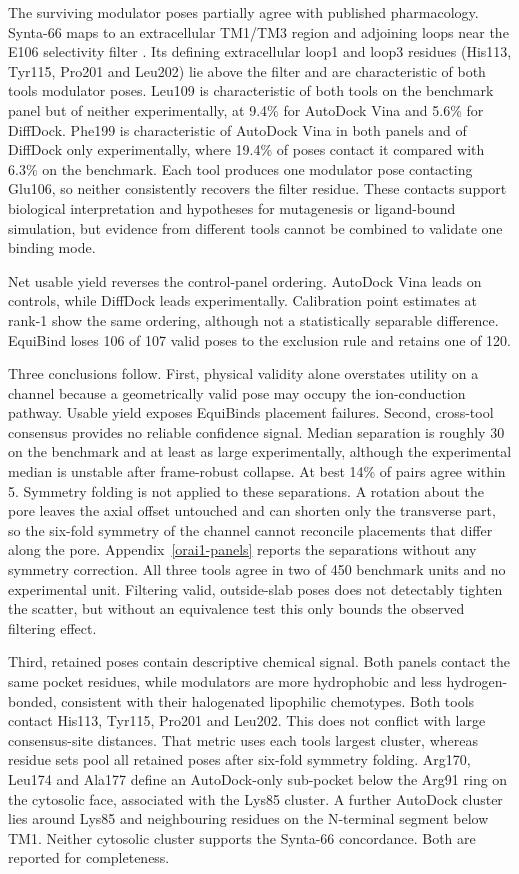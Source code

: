 The surviving modulator poses partially agree with published pharmacology. Synta-66 maps to an extracellular TM1/TM3 region and adjoining loops near the E106 selectivity filter \cite{ref071}. Its defining extracellular loop1 and loop3 residues (His113, Tyr115, Pro201 and Leu202) lie above the filter and are characteristic of both tools\textquotesingle{} modulator poses. Leu109 is characteristic of both tools on the benchmark panel but of neither experimentally, at 9.4\% for AutoDock Vina and 5.6\% for DiffDock. Phe199 is characteristic of AutoDock Vina in both panels and of DiffDock only experimentally, where 19.4\% of poses contact it compared with 6.3\% on the benchmark. Each tool produces one modulator pose contacting Glu106, so neither consistently recovers the filter residue. These contacts support biological interpretation and hypotheses for mutagenesis or ligand-bound simulation, but evidence from different tools cannot be combined to validate one binding mode.

Net usable yield reverses the control-panel ordering. AutoDock Vina leads on controls, while DiffDock leads experimentally. Calibration point estimates at rank-1 show the same ordering, although not a statistically separable difference. EquiBind loses 106 of 107 valid poses to the exclusion rule and retains one of 120.

Three conclusions follow. First, physical validity alone overstates utility on a channel because a geometrically valid pose may occupy the ion-conduction pathway. Usable yield exposes EquiBind\textquotesingle s placement failures. Second, cross-tool consensus provides no reliable confidence signal. Median separation is roughly 30\angstrom{} on the benchmark and at least as large experimentally, although the experimental median is unstable after frame-robust collapse. At best 14\% of pairs agree within 5\angstrom{}. Symmetry folding is not applied to these separations. A rotation about the pore leaves the axial offset untouched and can shorten only the transverse part, so the six-fold symmetry of the channel cannot reconcile placements that differ along the pore. Appendix~\ref{orai1-panels} reports the separations without any symmetry correction. All three tools agree in two of 450 benchmark units and no experimental unit. Filtering valid, outside-slab poses does not detectably tighten the scatter, but without an equivalence test this only bounds the observed filtering effect.

Third, retained poses contain descriptive chemical signal. Both panels contact the same pocket residues, while modulators are more hydrophobic and less hydrogen-bonded, consistent with their halogenated lipophilic chemotypes. Both tools contact His113, Tyr115, Pro201 and Leu202. This does not conflict with large consensus-site distances. That metric uses each tool\textquotesingle s largest cluster, whereas residue sets pool all retained poses after six-fold symmetry folding. Arg170, Leu174 and Ala177 define an AutoDock-only sub-pocket below the Arg91 ring on the cytosolic face, associated with the Lys85 cluster. A further AutoDock cluster lies around Lys85 and neighbouring residues on the N-terminal segment below TM1. Neither cytosolic cluster supports the Synta-66 concordance. Both are reported for completeness.

